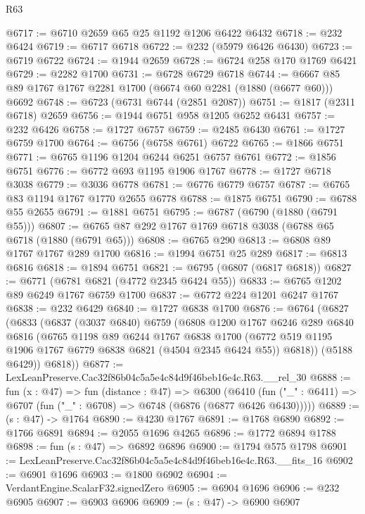\begin{lexlean}{R63}
\begin{coremodule}
@6717 := @6710 @2659 @65 @25 @1192 @1206 @6422 @6432
@6718 := @232 @6424
@6719 := @6717 @6718
@6722 := @232 (@5979 @6426 @6430)
@6723 := @6719 @6722
@6724 := @1944 @2659
@6728 := @6724 @258 @170 @1769 @6421
@6729 := @2282 @1700
@6731 := @6728 @6729 @6718
@6744 := @6667 @85 @89 @1767 @1767 @2281 @1700 (@6674 @60 @2281 (@1880 (@6677 @60))) @6692
@6748 := @6723 (@6731 @6744 (@2851 @2087))
@6751 := @1817 (@2311 @6718) @2659
@6756 := @1944 @6751 @958 @1205 @6252 @6431
@6757 := @232 @6426
@6758 := @1727 @6757
@6759 := @2485 @6430
@6761 := @1727 @6759 @1700
@6764 := @6756 (@6758 @6761) @6722
@6765 := @1866 @6751
@6771 := @6765 @1196 @1204 @6244 @6251 @6757 @6761
@6772 := @1856 @6751
@6776 := @6772 @693 @1195 @1906 @1767
@6778 := @1727 @6718 @3038
@6779 := @3036 @6778
@6781 := @6776 @6779 @6757
@6787 := @6765 @83 @1194 @1767 @1770 @2655 @6778
@6788 := @1875 @6751
@6790 := @6788 @55 @2655
@6791 := @1881 @6751
@6795 := @6787 (@6790 (@1880 (@6791 @55)))
@6807 := @6765 @87 @292 @1767 @1769 @6718 @3038 (@6788 @65 @6718 (@1880 (@6791 @65)))
@6808 := @6765 @290
@6813 := @6808 @89 @1767 @1767 @289 @1700
@6816 := @1994 @6751 @25 @289
@6817 := @6813 @6816
@6818 := @1894 @6751
@6821 := @6795 (@6807 (@6817 @6818))
@6827 := @6771 (@6781 @6821 (@4772 @2345 @6424 @55))
@6833 := @6765 @1202 @89 @6249 @1767 @6759 @1700
@6837 := @6772 @224 @1201 @6247 @1767
@6838 := @232 @6429
@6840 := @1727 @6838 @1700
@6876 := @6764
    (@6827
      (@6833
        (@6837
          (@3037 @6840)
          @6759
          (@6808
            @1200
            @1767
            @6246
            @289
            @6840
            @6816
            (@6765
              @1198
              @89
              @6244
              @1767
              @6838
              @1700
              (@6772 @519 @1195 @1906 @1767 @6779 @6838 @6821 (@4504 @2345 @6424 @55))
              @6818))
          (@5188 @6429))
        @6818))
@6877 := LexLeanPreserve.Cac32f86b04c5a5e4c84d9f46beb16e4c.R63.__rel_30
@6888 := fun (x : @47) =>
  fun (distance : @47) =>
  @6300
    (@6410 (fun ("_" : @6411) => @6707 (fun ("_" : @6708) => @6748 (@6876 (@6877 @6426 @6430)))))
@6889 := (s : @47) -> @1764
@6890 := @4230 @1767
@6891 := @1768 @6890
@6892 := @1766 @6891
@6894 := @2055 @1696 @4265
@6896 := @1772 @6894 @1788
@6898 := fun (s : @47) => @6892 @6896
@6900 := @1794 @575 @1798
@6901 := LexLeanPreserve.Cac32f86b04c5a5e4c84d9f46beb16e4c.R63.__fits_16
@6902 := @6901 @1696
@6903 := @1800 @6902
@6904 := VerdantEngine.ScalarF32.signedZero
@6905 := @6904 @1696
@6906 := @232 @6905
@6907 := @6903 @6906
@6909 := (s : @47) -> @6900 @6907

\end{coremodule}
\end{lexlean}
